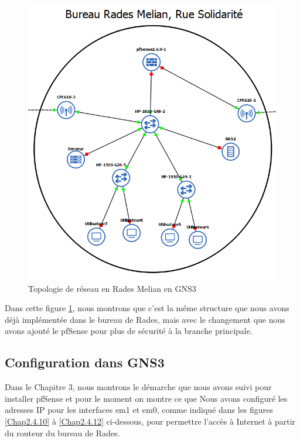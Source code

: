 \begin{figure}[H]
\centering
\includegraphics[width=15cm]{Images/BRadesMelian-Topologie.png}
\caption{Topologie de réseau en Rades Melian en GNS3}
\label{Chap2.4.1}
\end{figure}    
\smallskip

Dans cette figure \ref{Chap2.4.1}, nous montrons que c'est la même structure que nous avons déjà implémentée dans le bureau de Rades, mais avec le changement que nous avons ajouté le pfSense pour plus de sécurité à la branche principale.

\subsection{Configuration dans GNS3}


Dans le Chapitre 3, nous montrons le démarche que nous avons suivi pour installer pfSense et pour le moment on montre ce que Nous avons configuré les adresses IP pour les interfaces em1 et em0, comme indiqué dans les figures \ref{Chap2.4.10} à \ref{Chap2.4.12} ci-dessous, pour permettre l'accès à Internet à partir du routeur du bureau de Rades.  \\


